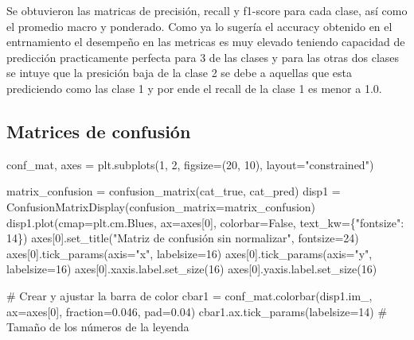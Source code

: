 \documentclass[
  10pt,
]{article}
\newenvironment{Shaded}{\begin{snugshade}}{\end{snugshade}}
\newcommand{\CommentTok}[1]{\textcolor[rgb]{0.37,0.37,0.37}{#1}}
\newcommand{\DecValTok}[1]{\textcolor[rgb]{0.68,0.00,0.00}{#1}}
\newcommand{\FloatTok}[1]{\textcolor[rgb]{0.68,0.00,0.00}{#1}}
\newcommand{\NormalTok}[1]{\textcolor[rgb]{0.00,0.23,0.31}{#1}}
\newcommand{\OperatorTok}[1]{\textcolor[rgb]{0.37,0.37,0.37}{#1}}
\newcommand{\StringTok}[1]{\textcolor[rgb]{0.13,0.47,0.30}{#1}}
\newcommand{\VariableTok}[1]{\textcolor[rgb]{0.07,0.07,0.07}{#1}}
\begin{document}
Se obtuvieron las matricas de precisión, recall y f1-score para cada
clase, así como el promedio macro y ponderado. Como ya lo sugería el
accuracy obtenido en el entrnamiento el desempeño en las metricas es muy
elevado teniendo capacidad de predicción practicamente perfecta para 3
de las clases y para las otras dos clases se intuye que la presición
baja de la clase 2 se debe a aquellas que esta prediciendo como las
clase 1 y por ende el recall de la clase 1 es menor a 1.0.

\subsection{Matrices de confusión}\label{matrices-de-confusiuxf3n}

\begin{Shaded}
\begin{Highlighting}[]
\NormalTok{conf\_mat, axes }\OperatorTok{=}\NormalTok{ plt.subplots(}\DecValTok{1}\NormalTok{, }\DecValTok{2}\NormalTok{, figsize}\OperatorTok{=}\NormalTok{(}\DecValTok{20}\NormalTok{, }\DecValTok{10}\NormalTok{), layout}\OperatorTok{=}\StringTok{"constrained"}\NormalTok{)}

\NormalTok{matrix\_confusion }\OperatorTok{=}\NormalTok{ confusion\_matrix(cat\_true, cat\_pred)}
\NormalTok{disp1 }\OperatorTok{=}\NormalTok{ ConfusionMatrixDisplay(confusion\_matrix}\OperatorTok{=}\NormalTok{matrix\_confusion)}
\NormalTok{disp1.plot(cmap}\OperatorTok{=}\NormalTok{plt.cm.Blues, ax}\OperatorTok{=}\NormalTok{axes[}\DecValTok{0}\NormalTok{], colorbar}\OperatorTok{=}\VariableTok{False}\NormalTok{, text\_kw}\OperatorTok{=}\NormalTok{\{}\StringTok{"fontsize"}\NormalTok{: }\DecValTok{14}\NormalTok{\})}
\NormalTok{axes[}\DecValTok{0}\NormalTok{].set\_title(}\StringTok{"Matriz de confusión sin normalizar"}\NormalTok{, fontsize}\OperatorTok{=}\DecValTok{24}\NormalTok{)}
\NormalTok{axes[}\DecValTok{0}\NormalTok{].tick\_params(axis}\OperatorTok{=}\StringTok{"x"}\NormalTok{, labelsize}\OperatorTok{=}\DecValTok{16}\NormalTok{)}
\NormalTok{axes[}\DecValTok{0}\NormalTok{].tick\_params(axis}\OperatorTok{=}\StringTok{"y"}\NormalTok{, labelsize}\OperatorTok{=}\DecValTok{16}\NormalTok{)}
\NormalTok{axes[}\DecValTok{0}\NormalTok{].xaxis.label.set\_size(}\DecValTok{16}\NormalTok{)}
\NormalTok{axes[}\DecValTok{0}\NormalTok{].yaxis.label.set\_size(}\DecValTok{16}\NormalTok{)}

\CommentTok{\# Crear y ajustar la barra de color}
\NormalTok{cbar1 }\OperatorTok{=}\NormalTok{ conf\_mat.colorbar(disp1.im\_, ax}\OperatorTok{=}\NormalTok{axes[}\DecValTok{0}\NormalTok{], fraction}\OperatorTok{=}\FloatTok{0.046}\NormalTok{, pad}\OperatorTok{=}\FloatTok{0.04}\NormalTok{)}
\NormalTok{cbar1.ax.tick\_params(labelsize}\OperatorTok{=}\DecValTok{14}\NormalTok{)  }\CommentTok{\# Tamaño de los números de la leyenda}



\end{Highlighting}
\end{Shaded}
\end{document}

